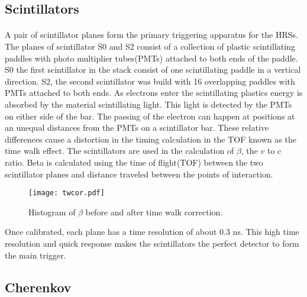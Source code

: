	\subsection{Scintillators}\label{sec:scin}
	\paragraph{} A pair of scintillator planes form the primary triggering apparatus for the HRSs. The planes of scintillator S0 and S2 consist of a collection of plastic scintillating paddles with photo multiplier tubes(PMTs) attached to both ends of the paddle. S0 the first scintillator in the stack consist of one scintillating paddle in a vertical direction. S2, the second scintillator was build with 16 overlapping paddles with PMTs attached to both ends. As electrons enter the scintillating plastics energy is absorbed by the material scintillating light. This light is detected by the PMTs on either side of the bar. The passing of the electron can happen at positions at an unequal distances from the PMTs on a scintillator bar. These relative differences cause a distortion in the timing calculation in the TOF known as the time walk effect. The scintillators are used in the calculation of $\beta$, the $v$ to $c$ ratio. Beta is calculated using the time of flight(TOF) between the two scintillator planes and distance traveled between the points of interaction. 
	\begin{figure}[h]
		\centering
		\texttt{[image: twcor.pdf]}
		\caption{Histogram of $\beta$ before and after time walk correction.}
		\label{fig:twcor}
	\end{figure}
	Once calibrated, each plane has a time resolution of about 0.3 ns. This high time resolution and quick response makes the scintillators the perfect detector to form the main trigger.  
	
	\subsection{Cherenkov}\label{sec:Cer}
